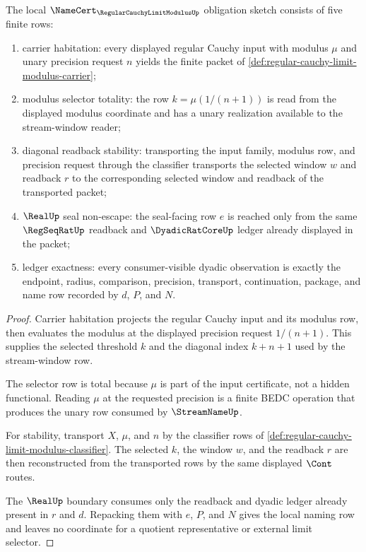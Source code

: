 \begin{theorem}
\label{thm:regular-cauchy-limit-modulus-namecert-obligations}
The local $\NameCert_{\RegularCauchyLimitModulusUp}$ obligation sketch consists of five finite rows:
\begin{enumerate}
\item carrier habitation: every displayed regular Cauchy input with modulus $\mu$ and unary precision request $n$ yields the finite packet of \autoref{def:regular-cauchy-limit-modulus-carrier};
\item modulus selector totality: the row $k=\mu(1/(n+1))$ is read from the displayed modulus coordinate and has a unary realization available to the stream-window reader;
\item diagonal readback stability: transporting the input family, modulus row, and precision request through the classifier transports the selected window $w$ and readback $r$ to the corresponding selected window and readback of the transported packet;
\item $\RealUp$ seal non-escape: the seal-facing row $e$ is reached only from the same $\RegSeqRatUp$ readback and $\DyadicRatCoreUp$ ledger already displayed in the packet;
\item ledger exactness: every consumer-visible dyadic observation is exactly the endpoint, radius, comparison, precision, transport, continuation, package, and name row recorded by $d$, $P$, and $N$.
\end{enumerate}
\end{theorem}
\begin{proof}
Carrier habitation projects the regular Cauchy input and its modulus row, then evaluates the modulus at the displayed precision request $1/(n+1)$. This supplies the selected threshold $k$ and the diagonal index $k+n+1$ used by the stream-window row.

The selector row is total because $\mu$ is part of the input certificate, not a hidden functional. Reading $\mu$ at the requested precision is a finite BEDC operation that produces the unary row consumed by $\StreamNameUp$.

For stability, transport $X$, $\mu$, and $n$ by the classifier rows of \autoref{def:regular-cauchy-limit-modulus-classifier}. The selected $k$, the window $w$, and the readback $r$ are then reconstructed from the transported rows by the same displayed $\Cont$ routes.

The $\RealUp$ boundary consumes only the readback and dyadic ledger already present in $r$ and $d$. Repacking them with $e$, $P$, and $N$ gives the local naming row and leaves no coordinate for a quotient representative or external limit selector.
\end{proof}

